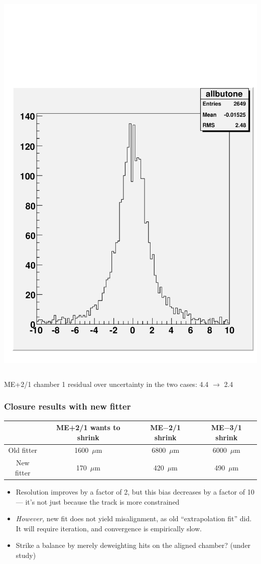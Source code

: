\documentclass[compress]{beamer}
\begin{document}
\begin{frame}
\begin{columns}
\includegraphics[width=\linewidth]{allbutone_ME+211.pdf}
\end{columns}

\scriptsize ME+2/1 chamber 1 residual over uncertainty in the two cases: 4.4 $\to$ 2.4
\end{frame}

\begin{frame}
\frametitle{Closure results with new fitter}
\small

\renewcommand{\arraystretch}{2}
\begin{tabular}{c c c c}
 & ME+2/1 wants to shrink & ME$-$2/1 shrink & ME$-$3/1 shrink \\\hline
Old fitter & 1600~$\mu$m & 6800~$\mu$m & 6000~$\mu$m \\
New fitter & 170~$\mu$m & 420~$\mu$m & 490~$\mu$m
\end{tabular}

\vfill
\begin{itemize}
\item Resolution improves by a factor of 2, but this bias decreases by
  a factor of 10--- it's not just because the track is more
  constrained
\item {\it However,} new fit does not yield misalignment, as old
  ``extrapolation fit'' did.  It will require iteration, and
  convergence is empirically slow.
\item Strike a balance by merely deweighting hits on the aligned
  chamber? (under study)
\end{itemize}
\end{frame}
\end{document}
